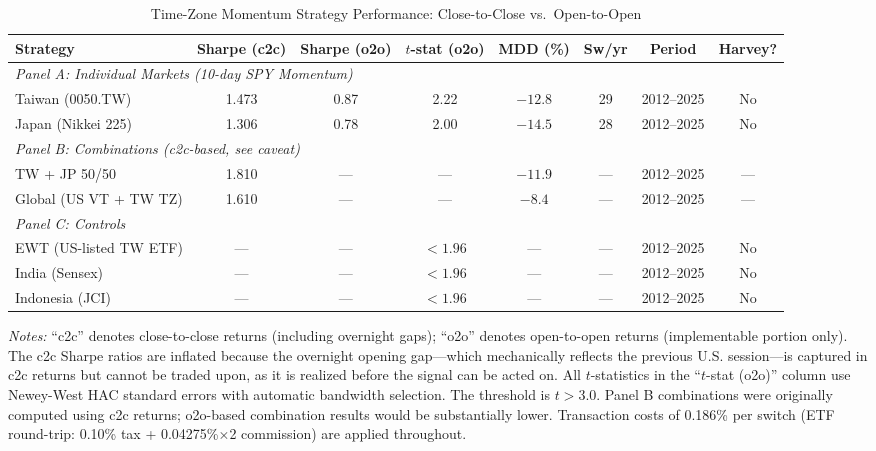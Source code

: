 \begin{table}[H]
\centering
\caption{Time-Zone Momentum Strategy Performance: Close-to-Close vs.\ Open-to-Open}
\label{tab:tz_results}
\begin{tabular}{lccccccc}
\toprule
Strategy & Sharpe (c2c) & Sharpe (o2o) & $t$-stat (o2o) & MDD (\%) & Sw/yr & Period & Harvey? \\
\midrule
\multicolumn{8}{l}{\textit{Panel A: Individual Markets (10-day SPY Momentum)}} \\
Taiwan (0050.TW) & 1.473 & 0.87 & 2.22 & $-12.8$ & 29 & 2012--2025 & No \\
Japan (Nikkei 225) & 1.306 & 0.78 & 2.00 & $-14.5$ & 28 & 2012--2025 & No \\
\midrule
\multicolumn{8}{l}{\textit{Panel B: Combinations (c2c-based, see caveat)}} \\
TW + JP 50/50 & 1.810 & --- & --- & $-11.9$ & --- & 2012--2025 & --- \\
Global (US VT + TW TZ) & 1.610 & --- & --- & $-8.4$ & --- & 2012--2025 & --- \\
\midrule
\multicolumn{8}{l}{\textit{Panel C: Controls}} \\
EWT (US-listed TW ETF) & --- & --- & $< 1.96$ & --- & --- & 2012--2025 & No \\
India (Sensex) & --- & --- & $< 1.96$ & --- & --- & 2012--2025 & No \\
Indonesia (JCI) & --- & --- & $< 1.96$ & --- & --- & 2012--2025 & No \\
\bottomrule
\end{tabular}
\begin{flushleft}
\small \textit{Notes:} ``c2c'' denotes close-to-close returns (including overnight gaps); ``o2o'' denotes open-to-open returns (implementable portion only). The c2c Sharpe ratios are inflated because the overnight opening gap---which mechanically reflects the previous U.S. session---is captured in c2c returns but cannot be traded upon, as it is realized before the signal can be acted on. All $t$-statistics in the ``$t$-stat (o2o)'' column use Newey-West HAC standard errors with automatic bandwidth selection. The \citet{harvey2016} threshold is $t > 3.0$. Panel B combinations were originally computed using c2c returns; o2o-based combination results would be substantially lower. Transaction costs of 0.186\% per switch (ETF round-trip: 0.10\% tax + 0.04275\%$\times$2 commission) are applied throughout.
\end{flushleft}
\end{table}

